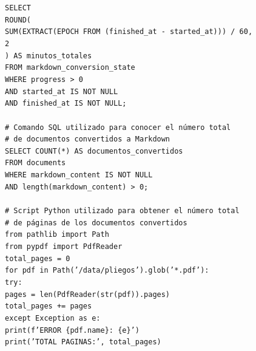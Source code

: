 \begin{tcolorbox}[
	colback=black!3,
	colframe=black!30,
	boxrule=0.5pt,
	arc=2mm,
	title=Terminal,
	fonttitle=\bfseries,
	breakable
]
{\footnotesize
\noindent
\texttt{SELECT}\\
	\hspace*{1em}\texttt{ROUND(}\\
		\hspace*{2em}\texttt{SUM(EXTRACT(EPOCH FROM (finished\_at - started\_at))) / 60,}\\
		\hspace*{2em}\texttt{2}\\
	\hspace*{1em}\texttt{) AS minutos\_totales}\\
\texttt{FROM markdown\_conversion\_state}\\
\texttt{WHERE progress > 0}\\
	\hspace*{1em}\texttt{AND started\_at IS NOT NULL}\\
	\hspace*{1em}\texttt{AND finished\_at IS NOT NULL;}\\
	\\
\texttt{\# Comando SQL utilizado para conocer el número total}\\
\texttt{\# de documentos convertidos a Markdown}\\
\texttt{SELECT COUNT(*) AS documentos\_convertidos}\\
\texttt{FROM documents}\\
\texttt{WHERE markdown\_content IS NOT NULL}\\
	\hspace*{1em}\texttt{AND length(markdown\_content) > 0;}\\
	\\
\texttt{\# Script Python utilizado para obtener el número total}\\
\texttt{\# de páginas de los documentos convertidos}\\
\texttt{from pathlib import Path}\\
\texttt{from pypdf import PdfReader}\\
\texttt{total\_pages = 0}\\
\texttt{for pdf in Path('/data/pliegos').glob('*.pdf'):}\\
	\hspace*{1em}\texttt{try:}\\
		\hspace*{2em}\texttt{pages = len(PdfReader(str(pdf)).pages)}\\
		\hspace*{2em}\texttt{total\_pages += pages}\\
	\hspace*{1em}\texttt{except Exception as e:}\\
		\hspace*{2em}\texttt{print(f'ERROR \{pdf.name\}: \{e\}') }\\
\texttt{print('TOTAL PAGINAS:', total\_pages)}
}
\end{tcolorbox}

